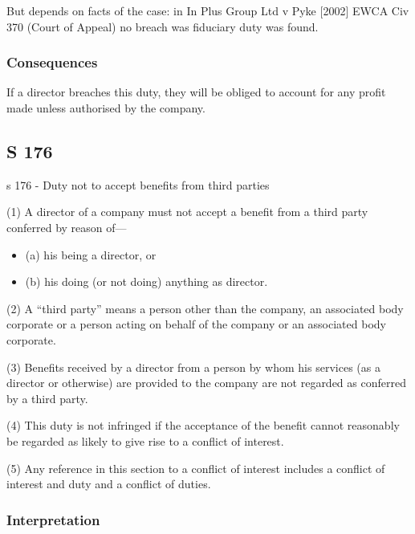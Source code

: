 \documentclass[
]{article}
\providecommand{\tightlist}{%
  \setlength{\itemsep}{0pt}\setlength{\parskip}{0pt}}
\newenvironment{env-136e818f-6bd8-45c9-b7d8-e6b8925f9e62}
{
    \savenotes\tcolorbox[blanker,breakable,left=5pt,borderline west={2pt}{-4pt}{green}]
}
{
    \endtcolorbox\spewnotes
}
\begin{document}
But depends on facts of the case: in In Plus Group Ltd v Pyke {[}2002{]}
EWCA Civ 370 (Court of Appeal) no breach was fiduciary duty was found.

\hypertarget{consequences}{%
\subsubsection{Consequences}\label{consequences}}

If a director breaches this duty, they will be obliged to account for
any profit made unless authorised by the company.

\hypertarget{s-176}{%
\subsection{S 176}\label{s-176}}

\begin{env-136e818f-6bd8-45c9-b7d8-e6b8925f9e62}

s 176 - Duty not to accept benefits from third parties

(1) A director of a company must not accept a benefit from a third party
conferred by reason of---

\begin{itemize}
\tightlist
\item
  (a) his being a director, or
\item
  (b) his doing (or not doing) anything as director.
\end{itemize}

(2) A ``third party'' means a person other than the company, an
associated body corporate or a person acting on behalf of the company or
an associated body corporate.

(3) Benefits received by a director from a person by whom his services
(as a director or otherwise) are provided to the company are not
regarded as conferred by a third party.

(4) This duty is not infringed if the acceptance of the benefit cannot
reasonably be regarded as likely to give rise to a conflict of interest.

(5) Any reference in this section to a conflict of interest includes a
conflict of interest and duty and a conflict of duties.

\end{env-136e818f-6bd8-45c9-b7d8-e6b8925f9e62}

\hypertarget{interpretation-3}{%
\subsubsection{Interpretation}\label{interpretation-3}}
\end{document}
